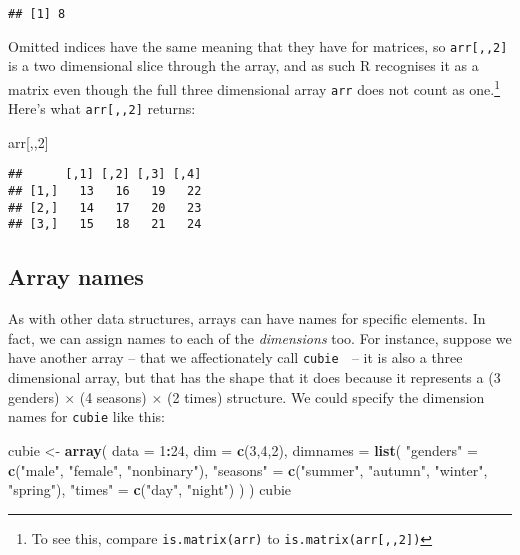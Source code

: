 \documentclass[]{book}
\newenvironment{Shaded}{\begin{snugshade}}{\end{snugshade}}
\newcommand{\DataTypeTok}[1]{\textcolor[rgb]{0.13,0.29,0.53}{#1}}
\newcommand{\DecValTok}[1]{\textcolor[rgb]{0.00,0.00,0.81}{#1}}
\newcommand{\KeywordTok}[1]{\textcolor[rgb]{0.13,0.29,0.53}{\textbf{#1}}}
\newcommand{\NormalTok}[1]{#1}
\newcommand{\OperatorTok}[1]{\textcolor[rgb]{0.81,0.36,0.00}{\textbf{#1}}}
\newcommand{\StringTok}[1]{\textcolor[rgb]{0.31,0.60,0.02}{#1}}
\let\rmarkdownfootnote\footnote%
\def\footnote{\protect\rmarkdownfootnote}
\begin{document}
\begin{verbatim}
## [1] 8
\end{verbatim}

Omitted indices have the same meaning that they have for matrices, so \texttt{arr{[},,2{]}} is a two dimensional slice through the array, and as such R recognises it as a matrix even though the full three dimensional array \texttt{arr} does not count as one.\footnote{To see this, compare \texttt{is.matrix(arr)} to \texttt{is.matrix(arr{[},,2{]})}} Here's what \texttt{arr{[},,2{]}} returns:

\begin{Shaded}
\begin{Highlighting}[]
\NormalTok{arr[,,}\DecValTok{2}\NormalTok{]}
\end{Highlighting}
\end{Shaded}

\begin{verbatim}
##      [,1] [,2] [,3] [,4]
## [1,]   13   16   19   22
## [2,]   14   17   20   23
## [3,]   15   18   21   24
\end{verbatim}

\hypertarget{array-names}{%
\subsection{Array names}\label{array-names}}

As with other data structures, arrays can have names for specific elements. In fact, we can assign names to each of the \emph{dimensions} too. For instance, suppose we have another array -- that we affectionately call \texttt{cubie} 🎁 -- it is also a three dimensional array, but that has the shape that it does because it represents a (3 genders) \(\times\) (4 seasons) \(\times\) (2 times) structure. We could specify the dimension names for \texttt{cubie} like this:

\begin{Shaded}
\begin{Highlighting}[]
\NormalTok{cubie <-}\StringTok{ }\KeywordTok{array}\NormalTok{(}
  \DataTypeTok{data =} \DecValTok{1}\OperatorTok{:}\DecValTok{24}\NormalTok{, }
  \DataTypeTok{dim =} \KeywordTok{c}\NormalTok{(}\DecValTok{3}\NormalTok{,}\DecValTok{4}\NormalTok{,}\DecValTok{2}\NormalTok{), }
  \DataTypeTok{dimnames =} \KeywordTok{list}\NormalTok{(}
    \StringTok{"genders"}\NormalTok{ =}\StringTok{ }\KeywordTok{c}\NormalTok{(}\StringTok{"male"}\NormalTok{, }\StringTok{"female"}\NormalTok{, }\StringTok{"nonbinary"}\NormalTok{),}
    \StringTok{"seasons"}\NormalTok{ =}\StringTok{ }\KeywordTok{c}\NormalTok{(}\StringTok{"summer"}\NormalTok{, }\StringTok{"autumn"}\NormalTok{, }\StringTok{"winter"}\NormalTok{, }\StringTok{"spring"}\NormalTok{),}
    \StringTok{"times"}\NormalTok{ =}\StringTok{ }\KeywordTok{c}\NormalTok{(}\StringTok{"day"}\NormalTok{, }\StringTok{"night"}\NormalTok{)}
\NormalTok{    )}
\NormalTok{  )}
\NormalTok{cubie}
\end{Highlighting}
\end{Shaded}
\end{document}

